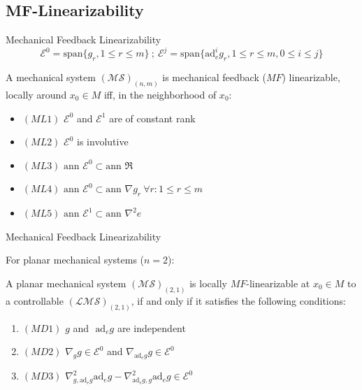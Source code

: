 \documentclass{beamer}
\begin{document}
\subsection{MF-Linearizability}

\begin{frame}{Mechanical Feedback Linearizability}
  \begin{equation*}
        \mathcal{E}^0 = \text{span} \{ g_r, 1 \leq r \leq m \} \ ; \ \mathcal{E}^j = \text{span} \{ \text{ad}^i_e g_r, 1 \leq r \leq m, 0 \leq i \leq j \}
\end{equation*}

\begin{thm}\label{thm:mfl}
    A mechanical system $(\mathcal{MS})_{(n,m)}$ is mechanical feedback ($MF$) linearizable, locally around $x_0 \in M$ iff, in the neighborhood of $x_0$:

    \begin{itemize}
        \item $(ML1)$ $\mathcal{E}^0$ and $\mathcal{E}^1$ are of constant rank
        \item $(ML2)$ $\mathcal{E}^0$ is involutive
        \item $(ML3)$ $\text{ann } \mathcal{E}^{0} \subset \text{ann } \mathfrak{R}$
        \item $(ML4)$ $\text{ann } \mathcal{E}^0 \subset \text{ann } \nabla g_r \ \forall r: 1 \leq r \leq m$
        \item $(ML5)$ $\text{ann } \mathcal{E}^1 \subset \text{ann } \nabla^2 e$
    \end{itemize}

\end{thm}
\end{frame}

\begin{frame}{Mechanical Feedback Linearizability}

For planar mechanical systems ($n=2$):

\begin{prop}
\label{prop:planar_mech}
A planar mechanical system $\mathcal{(MS)}_{(2,1)}$ is locally $MF$-linearizable at $x_0 \in M$ to a controllable $\mathcal{(LMS)}_{(2,1)}$, if and only if it satisfies the following conditions:
\begin{enumerate}
    \item $(MD1)$ $g$ and $\text{ ad}_e g$ are independent
    \item $(MD2)$ $\nabla_g g \in \mathcal{E}^0$ and $\nabla_{\text{ad}_e g} g \in \mathcal{E}^0$
    \item $(MD3)$ $\nabla^2_{g, \text{ad}_e g} \text{ad}_e g - \nabla^2_{\text{ad}_e g, g} \text{ad}_e g \in \mathcal{E}^0$
\end{enumerate}
\end{prop}
\end{frame}
\end{document}
